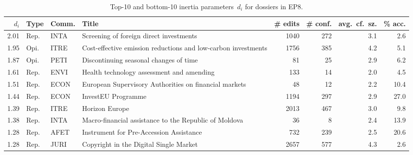 \begin{sidewaystable}
	\centering
	\caption{Top-10 and bottom-10 inertia parameters~$d_i$ for dossiers in EP8.}
	\label{lmp:tab:inertia_params}
	\begin{tabular}{rlllrrrr}
		\toprule
		$d_i$ & Type & Comm. & Title                                                         & \# edits & \# conf. & avg.\ cf.\ sz. & \% acc. \\
		\midrule

		2.01  & Rep. & INTA  & Screening of foreign direct investments                       & 1040     & 272      & 3.1            & 2.6     \\
		1.95  & Opi. & ITRE  & Cost-effective emission reductions and low-carbon investments & 1756     & 385      & 4.2            & 5.1     \\
		1.87  & Opi. & PETI  & Discontinuing seasonal changes of time                        & 81       & 25       & 2.9            & 6.2     \\
		1.61  & Rep. & ENVI  & Health technology assessment and amending                     & 133      & 14       & 2.0            & 4.5     \\
		1.51  & Rep. & ECON  & European Supervisory Authorities on financial markets         & 48       & 12       & 2.2            & 10.4    \\
		1.44  & Rep. & ECON  & InvestEU Programme                                            & 1194     & 297      & 2.9            & 27.0    \\
		1.39  & Rep. & ITRE  & Horizon Europe                                                & 2013     & 467      & 3.0            & 9.8     \\
		1.38  & Rep. & INTA  & Macro-financial assistance to the Republic of Moldova         & 36       & 8        & 2.4            & 13.9    \\
		1.28  & Rep. & AFET  & Instrument for Pre-Accession Assistance                       & 732      & 239      & 2.5            & 20.6    \\
		1.28  & Rep. & JURI  & Copyright in the Digital Single Market                        & 2657     & 577      & 4.3            & 2.6     \\

		\midrule


\end{tabular}
\end{sidewaystable}
